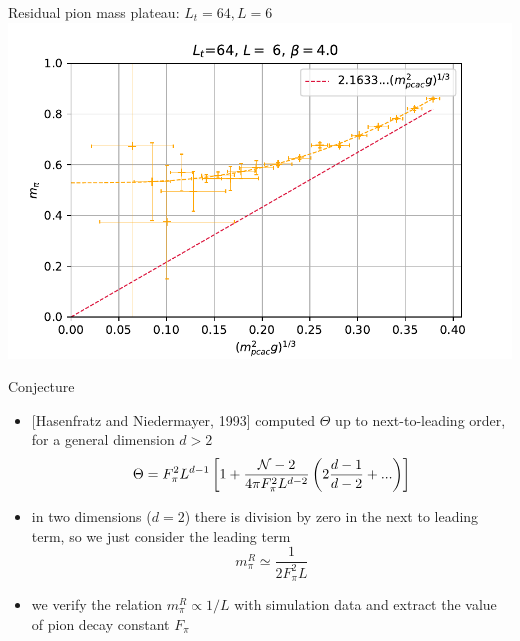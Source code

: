 \documentclass[english]{beamer}
\begin{document}
\begin{frame}{Residual pion mass plateau: $L_t = 64, L = 6$}
  \includegraphics[width=1\textwidth]{figs/Mpi6x64Pt10}
\end{frame}

\begin{frame}{Conjecture}
  \begin{itemize}
    \item {[Hasenfratz and Niedermayer, 1993]} computed $\Theta$
      up to next-to-leading order, for a general dimension $d > 2$
            \[
        \Theta = F_\pi^2 L^{d-1} \left[1 +
          \frac{{\cal N} - 2}{4\pi F_\pi^2 L^{d-2}}
          \left(2\frac{d - 1}{d - 2} + ...\right) \right]
      \]
    \item in two dimensions ($d = 2$) there is division by zero 
      in the next to leading term, so we just consider the 
      leading term
      \[
        m_\pi^R \simeq \frac{1}{2F_\pi^2 L}
      \]
    \item we verify the relation $m_\pi^R \propto 1 / L$ with
      simulation data and extract the value of pion decay
      constant $F_\pi$
  \end{itemize}
\end{frame}
\end{document}
